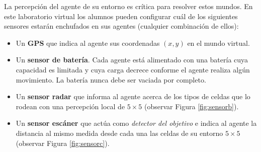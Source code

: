La percepción del agente de su entorno es crítica para resolver estos mundos. En este laboratorio virtual los alumnos pueden configurar cuál de los siguientes sensores estarán enchufados en sus agentes (cualquier combinación de ellos):

\begin{itemize}
	\item Un \textbf{GPS} que indica al agente sus coordenadas $(x,y)$ en el mundo virtual.
	\item Un \textbf{sensor de batería}. Cada agente está alimentado con una batería cuya capacidad es limitada y cuya carga decrece conforme el agente realiza algún movimiento. La batería nunca debe ser vaciada por completo.
	\item Un \textbf{sensor radar} que informa al agente acerca de los tipos de celdas que lo rodean con una percepción local de $5 \times 5$ (observar Figura \ref{fig:sensorb}).
	\item Un \textbf{sensor escáner} que actúa como \emph{detector del objetivo} e indica al agente la distancia al mismo medida desde cada una las celdas de su entorno $5 \times 5$ (observar Figura \ref{fig:sensorc}).
\end{itemize}

